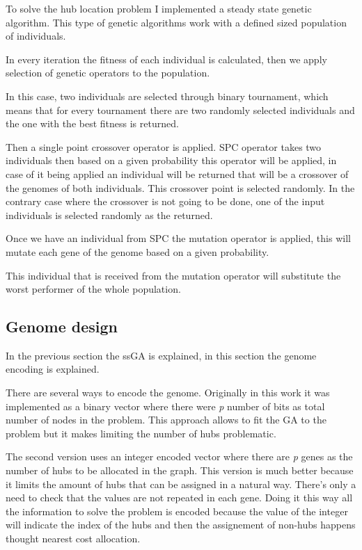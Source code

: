 \documentclass[12pt,oneside,a4paper]{article}
\begin{document}
    To solve the hub location problem I implemented a steady state genetic algorithm.
    This type of genetic algorithms work with a defined sized population of individuals.

    In every iteration the fitness of each individual is calculated, then we apply selection of genetic operators to
    the population.

    In this case, two individuals are selected through binary tournament, which means that for every tournament
    there are two randomly selected individuals and the one with the best fitness is returned.

    Then a single point crossover operator is applied.
    SPC operator takes two individuals then based on a given probability this operator will be applied, in case of it
    being applied an individual will be returned that will be a crossover of the genomes of both individuals.
    This crossover point is selected randomly.
    In the contrary case where the crossover is not going to be done, one of the input individuals is selected
    randomly as the returned.

    Once we have an individual from SPC the mutation operator is applied, this will mutate each gene of the genome
    based on a given probability.

    This individual that is received from the mutation operator will substitute the worst performer of the whole
    population.

    \subsection{Genome design}
    In the previous section the ssGA is explained, in this section the genome encoding is explained.

    There are several ways to encode the genome.
    Originally in this work it was implemented as a binary vector where there were \textit{p} number of bits as total
    number of nodes in the problem.
    This approach allows to fit the GA to the problem but it makes limiting the number of hubs problematic.

    The second version uses an integer encoded vector where there are \textit{p} genes as the number of hubs to be
    allocated in the graph.
    This version is much better because it limits the amount of hubs that can be assigned in a natural way.
    There's only a need to check that the values are not repeated in each gene.
    Doing it this way all the information to solve the problem is encoded because the value of the integer will
    indicate the index of the hubs and then the assignement of non-hubs happens thought nearest cost allocation.
\end{document}
